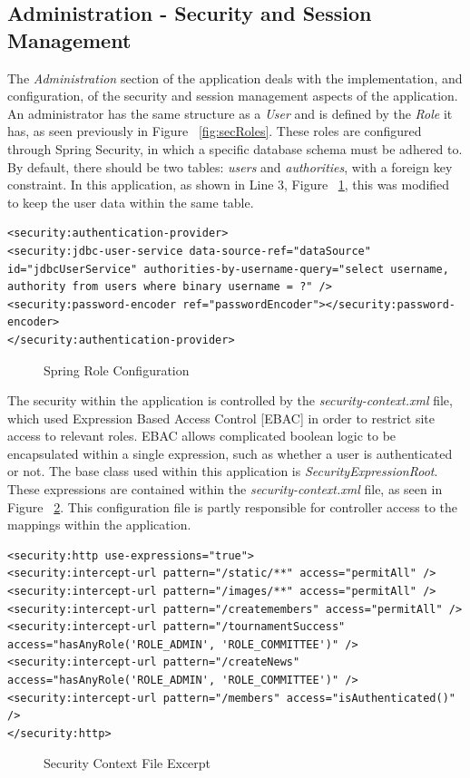 \label{sec:adminImp}
\subsection{Administration - Security and Session Management}

The \textit{Administration} section of the application deals with the implementation, and configuration, of the security and session management aspects of the application. An administrator has the same structure as a \textit{User} and is defined by the \textit{Role} it has, as seen previously in Figure ~\ref{fig:secRoles}. These roles are configured through Spring Security, in which a specific database schema must be adhered to. By default, there should be two tables: \textit{users} and \textit{authorities}, with a foreign key constraint. In this application, as shown in Line 3, Figure ~\ref{fig:roleConfig}, this was modified to keep the user data within the same table.

\begin{lstlisting}
<security:authentication-provider>
<security:jdbc-user-service data-source-ref="dataSource"
id="jdbcUserService" authorities-by-username-query="select username, authority from users where binary username = ?" />
<security:password-encoder ref="passwordEncoder"></security:password-encoder>
</security:authentication-provider>
\end{lstlisting}
\begin{figure}[H]
\caption{Spring Role Configuration}
\label{fig:roleConfig}
\end{figure}

The security within the application is controlled by the \textit{security-context.xml} file, which used Expression Based Access Control [EBAC] in order to restrict site access to relevant roles. EBAC allows complicated boolean logic to be encapsulated within a single expression, such as whether a user is authenticated or not. The base class used within this application is \textit{SecurityExpressionRoot}. These expressions are contained within the \textit{security-context.xml} file, as seen in Figure ~\ref{fig:secContext}. This configuration file is partly responsible for controller access to the mappings within the application. 

\begin{lstlisting}
<security:http use-expressions="true">
<security:intercept-url pattern="/static/**" access="permitAll" />
<security:intercept-url pattern="/images/**" access="permitAll" />
<security:intercept-url pattern="/createmembers" access="permitAll" />
<security:intercept-url pattern="/tournamentSuccess" access="hasAnyRole('ROLE_ADMIN', 'ROLE_COMMITTEE')" />
<security:intercept-url pattern="/createNews" access="hasAnyRole('ROLE_ADMIN', 'ROLE_COMMITTEE')" />
<security:intercept-url pattern="/members" access="isAuthenticated()" />
</security:http>
\end{lstlisting}
\begin{figure}[H]
\caption{Security Context File Excerpt}
\label{fig:secContext}
\end{figure}

